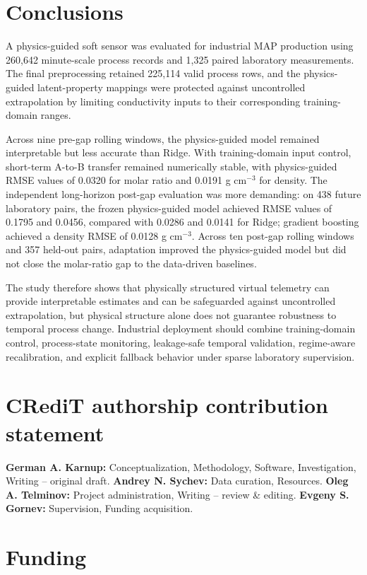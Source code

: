 \documentclass[11pt]{article}
\begin{document}
\section{Conclusions}

A physics-guided soft sensor was evaluated for industrial MAP production using 260,642 minute-scale process records and 1,325 paired laboratory measurements. The final preprocessing retained 225,114 valid process rows, and the physics-guided latent-property mappings were protected against uncontrolled extrapolation by limiting conductivity inputs to their corresponding training-domain ranges.

Across nine pre-gap rolling windows, the physics-guided model remained interpretable but less accurate than Ridge. With training-domain input control, short-term A-to-B transfer remained numerically stable, with physics-guided RMSE values of 0.0320 for molar ratio and 0.0191 g cm$^{-3}$ for density. The independent long-horizon post-gap evaluation was more demanding: on 438 future laboratory pairs, the frozen physics-guided model achieved RMSE values of 0.1795 and 0.0456, compared with 0.0286 and 0.0141 for Ridge; gradient boosting achieved a density RMSE of 0.0128 g cm$^{-3}$. Across ten post-gap rolling windows and 357 held-out pairs, adaptation improved the physics-guided model but did not close the molar-ratio gap to the data-driven baselines.

The study therefore shows that physically structured virtual telemetry can provide interpretable estimates and can be safeguarded against uncontrolled extrapolation, but physical structure alone does not guarantee robustness to temporal process change. Industrial deployment should combine training-domain control, process-state monitoring, leakage-safe temporal validation, regime-aware recalibration, and explicit fallback behavior under sparse laboratory supervision.

\section*{CRediT authorship contribution statement}

\textbf{German A. Karnup:} Conceptualization, Methodology, Software, Investigation, Writing -- original draft. 
\textbf{Andrey N. Sychev:} Data curation, Resources. 
\textbf{Oleg A. Telminov:} Project administration, Writing -- review \& editing. 
\textbf{Evgeny S. Gornev:} Supervision, Funding acquisition.

\section*{Funding}
\end{document}
